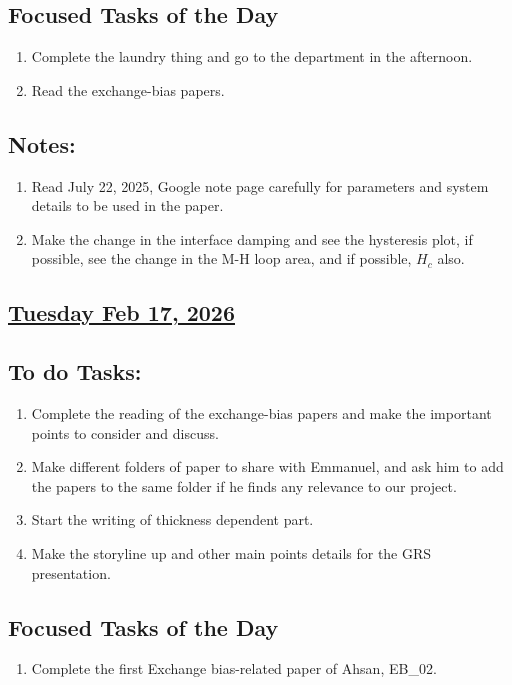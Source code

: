 \subsection*{Focused Tasks of the Day}
\begin{enumerate}[\ding{212}]  %
    \item Complete the laundry thing and go to the department in the afternoon.
    \item Read the exchange-bias papers.
\end{enumerate}
\subsection*{Notes:}
\begin{enumerate}
    \item Read July 22, 2025, Google note page carefully for parameters and system details to be used in the paper.
    \item Make the change in the interface damping and see the hysteresis plot, if possible, see the change in the M-H loop area, and if possible, $H_c$ also.
\end{enumerate}
\subsection*{\underline{Tuesday Feb 17, 2026}}
\subsection*{To do Tasks:}
\begin{enumerate}
    \item Complete the reading of the exchange-bias papers and make the important points to consider and discuss. 
    \item Make different folders of paper to share with Emmanuel, and ask him to add the papers to the same folder if he finds any relevance to our project.
    \item Start the writing of thickness dependent part.
    \item Make the storyline up and other main points details for the GRS presentation.
\end{enumerate}
\subsection*{Focused Tasks of the Day}
\begin{enumerate}[\ding{52}]  %
    \item Complete the first Exchange bias-related paper of Ahsan, EB\_02.
\end{enumerate}
